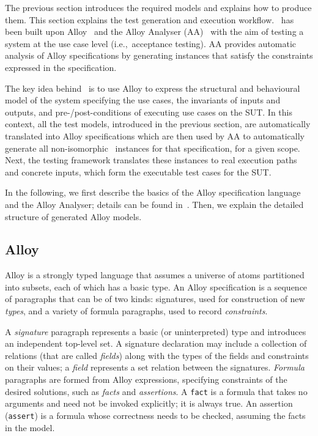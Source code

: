 %
%
\label{sec:test-generation-execution}
The previous section introduces the required models and explains how to produce them. This section explains the test generation and execution workflow. \this~has been built upon Alloy~\cite{Jackson2002} and the Alloy Analyser (AA)~\cite{Jackson2000} with the aim of testing a system at the use case level (i.e.,\ acceptance testing). AA provides automatic analysis of Alloy specifications by generating instances that satisfy the constraints expressed in the specification.

The key idea behind \this~is to use Alloy to express the structural and behavioural model of the system specifying the use cases, the invariants of inputs and outputs, and pre-/post-conditions of executing use cases on the SUT. In this context, all the test models, introduced in the previous section, are automatically translated into Alloy specifications which are then used by AA to automatically generate all non-isomorphic~\cite{Shlyakhter2007} instances for that specification, for a given scope. Next, the testing framework translates these instances to real execution paths and concrete inputs, which form the executable test cases for the SUT.

In the following, we first describe the basics of the Alloy specification language and the Alloy Analyser; details can be found in~\cite{Jackson2000,Jackson2002,Jackson2012}. Then, we explain the detailed structure of generated Alloy models.

\subsection{Alloy}
\label{sec:test-generation-execution-alloy}
Alloy is a strongly typed language that assumes a universe of atoms partitioned into subsets, each of which has a basic type. An Alloy specification is a sequence of paragraphs that can be of two kinds: signatures, used for construction of new \textit{types}, and a variety of formula paragraphs, used to record \textit{constraints}. 

A \textit{signature} paragraph represents a basic (or uninterpreted) type and introduces an independent top-level set. A signature declaration may include a collection of relations (that are called \textit{fields}) along with the types of the fields and constraints on their values; a \textit{field} represents a set relation between the signatures. \textit{Formula} paragraphs are formed from Alloy expressions, specifying constraints of the desired solutions, such as \textit{facts} and \textit{assertions}. A \texttt{fact} is a formula that takes no arguments and need not be invoked explicitly; it is always true. An assertion (\texttt{assert}) is a formula whose correctness needs to be checked, assuming the facts in the model. 

